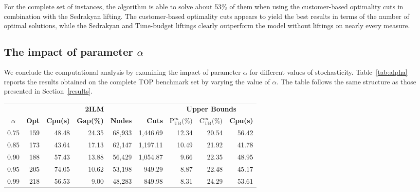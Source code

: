\documentclass[11pt]{article}
\theoremstyle{definition}
\begin{document}
For the complete set of instances, the algorithm is able to solve about 53\% of them when using the customer-based optimality cuts in combination with the Sedrakyan lifting. The customer-based optimality cuts appears to yield the best results in terms of the number of optimal solutions, while the Sedrakyan and Time-budget liftings clearly outperform the model without liftings on nearly every measure.

\subsection{The impact of parameter \texorpdfstring{$\alpha$}{alpha}}
\label{alpha}

We conclude the computational analysis by examining the impact of parameter $\alpha$ for different values of stochasticity.
%
Table~\ref{tab:alpha} reports the results obtained on the complete TOP benchmark set by varying the value of $\alpha$. The table follows the same structure as those presented in Section~\ref{results}.

\begin{center}
\begin{tabular}{crrrrrrrr}
\toprule
 & \multicolumn{5}{c}{\textbf{2ILM}}  & \multicolumn{3}{c}{\textbf{Upper Bounds}} \\
$\alpha$ & \textbf{Opt} & \textbf{Cpu(s)} & \textbf{Gap(\%)} & \textbf{Nodes} & \textbf{Cuts} & \multicolumn{1}{c}{\textbf{$\text{P}^m_{\text{UB}}\text{(\%)}$}} & \multicolumn{1}{c}{\textbf{$\text{C}^m_{\text{UB}}\text{(\%)}$}} & \multicolumn{1}{c}{\textbf{Cpu(s)}} \\ \cmidrule(r){1-1} \cmidrule(lr){2-6} \cmidrule(l){7-9}
0.75 & 159  & 48.48 & 24.35  & 68,933 & 1,446.69 & 12.34  & 20.54  & 56.42 \\
0.85 & 173  & 43.64 & 17.13  & 62,147 & 1,197.11 & 10.49  & 21.92  & 41.78 \\
0.90 & 188  & 57.43 & 13.88  & 56,429 & 1,054.87 & 9.66 & 22.35  & 48.95 \\
0.95 & 205  & 74.05 & 10.62  & 53,198 & 949.29  & 8.87 & 22.48  & 45.17 \\
0.99 & 218  & 56.53 & 9.00 & 48,283 & 849.98  & 8.31 & 24.29  & 53.61 \\ \bottomrule
\end{tabular}
\label{tab:alpha}
\end{center}
\end{document}
